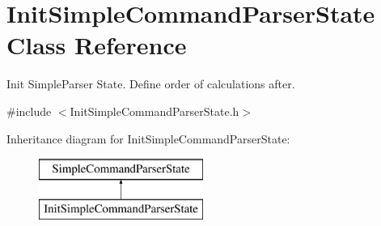 \hypertarget{class_init_simple_command_parser_state}{}\section{Init\+Simple\+Command\+Parser\+State Class Reference}
\label{class_init_simple_command_parser_state}


Init Simple\+Parser State. Define order of calculations after.  




{\ttfamily \#include $<$Init\+Simple\+Command\+Parser\+State.\+h$>$}

Inheritance diagram for Init\+Simple\+Command\+Parser\+State\+:\begin{figure}[H]
\begin{center}
\leavevmode
\includegraphics[height=2.000000cm]{class_init_simple_command_parser_state}
\end{center}
\end{figure}
